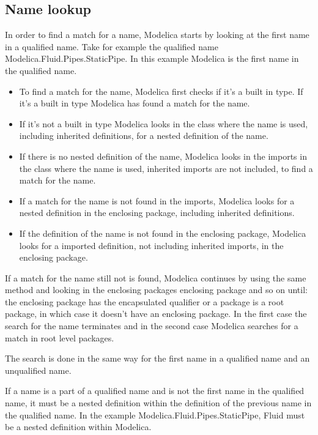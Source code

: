 \documentclass{cslthse-msc}
\begin{document}
\subsection{Name lookup}
In order to find a match for a name, Modelica starts by looking at the first name in a qualified name. Take for example the qualified name Modelica.Fluid.Pipes.StaticPipe. In this example Modelica is the first name in the qualified name.
\begin{itemize}
\item To find a match for the name, Modelica first checks if it's a built in type. If it's a built in type Modelica has found a match for the name.

\item If it's not a built in type Modelica looks in the class where the name is used, including inherited definitions, for a nested definition of the name. 

\item If there is no nested definition of the name, Modelica looks in the imports in the class where the name is used, inherited imports are not included, to find a match for the name.

\item If a match for the name is not found in the imports, Modelica looks for a nested definition in the enclosing package, including inherited definitions.

\item If the definition of the name is not found in the enclosing package, Modelica looks for a imported definition, not including inherited imports, in the enclosing package.
\end{itemize}
If a match for the name still not is found, Modelica continues by using the same method and looking in the enclosing packages enclosing package and so on until: the enclosing package has the encapsulated qualifier or a package is a root package, in which case it doesn't have an enclosing package. In the first case the search for the name terminates and in the second case Modelica searches for a match in root level packages.

The search is done in the same way for the first name in a qualified name and an unqualified name.

If a name is a part of a qualified name and is not the first name in the qualified name, it must be a nested definition within the definition of the previous name in the qualified name. In the example Modelica.Fluid.Pipes.StaticPipe, Fluid must be a nested definition within Modelica.\cite{modelicamodelica, tillermodelica}
\end{document}
